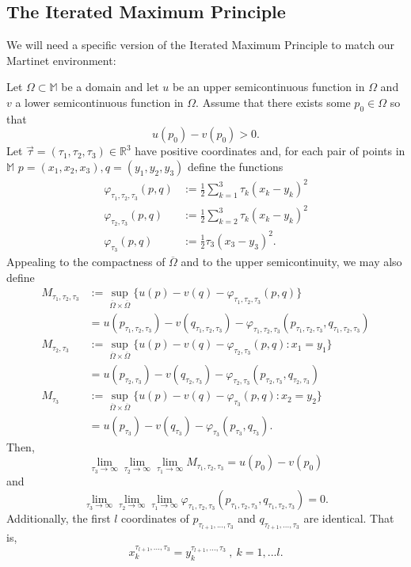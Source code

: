 \documentclass[reqno]{amsart}
\begin{document}
\subsection{The Iterated Maximum Principle}
We will need a specific version of the Iterated Maximum Principle to match our Martinet environment: 
\begin{lemma}\label{IMP}\cite{B:GS}
Let $\Omega\subset\mathbb{M}$ be a domain and let  $u$ be an upper semicontinuous function in $\Omega$ and $v$ a lower semicontinuous function in $\Omega$.  Assume that there exists some $p_0\in\Omega$ so that
\[u(p_0)-v(p_0)>0.\]
Let $\vec{\tau}=(\tau_1,\tau_2,\tau_3)\in\mathbb{R}^3$ have positive coordinates and, for each pair of points in $\mathbb{M}$ $p=(x_1,x_2,x_3),q=(y_1,y_2,y_3)$ define the functions 
\begin{align*}
\varphi_{\tau_1,\tau_2,\tau_3}(p,q)&:=\frac{1}{2}\sum_{k=1}^3\tau_k(x_k-y_k)^2\\
\varphi_{\tau_2,\tau_3}(p,q)&:=\frac{1}{2}\sum_{k=2}^3\tau_k(x_k-y_k)^2\\
\varphi_{\tau_3}(p,q)&:=\frac{1}{2}\tau_3(x_3-y_3)^2.
\end{align*}
Appealing to the compactness of $\overline{\Omega}$ and to the upper semicontinuity, we may also define 
\begin{align*} 
M_{\tau_1,\tau_2,\tau_3}&:=\sup_{\overline{\Omega}\times\overline{\Omega}}\{u(p)-v(q)-\varphi_{\tau_1,\tau_2,\tau_3}(p,q)\}\\
&=u(p_{\tau_1,\tau_2,\tau_3})-v(q_{\tau_1,\tau_2,\tau_3})-\varphi_{\tau_1,\tau_2,\tau_3}(p_{\tau_1,\tau_2,\tau_3},q_{\tau_1,\tau_2,\tau_3})\\
M_{\tau_2,\tau_3}&:=\sup_{\overline{\Omega}\times\overline{\Omega}}\{u(p)-v(q)-\varphi_{\tau_2,\tau_3}(p,q):x_1=y_1\}\\
&=u(p_{\tau_2,\tau_3})-v(q_{\tau_2,\tau_3})-\varphi_{\tau_2,\tau_3}(p_{\tau_2,\tau_3},q_{\tau_2,\tau_3})\\
M_{\tau_3}&:=\sup_{\overline{\Omega}\times\overline{\Omega}}\{u(p)-v(q)-\varphi_{\tau_3}(p,q):x_2=y_2\}\\
&=u(p_{\tau_3})-v(q_{\tau_3})-\varphi_{\tau_3}(p_{\tau_3},q_{\tau_3}).
\end{align*}
Then,
\[\lim_{\tau_3\to\infty}\lim_{\tau_2\to\infty}\lim_{\tau_1\to\infty}M_{\tau_1,\tau_2,\tau_3}=u(p_0)-v(p_0)\]
and
\[\lim_{\tau_3\to\infty}\lim_{\tau_2\to\infty}\lim_{\tau_1\to\infty}\varphi_{\tau_1,\tau_2,\tau_3}(p_{\tau_1,\tau_2,\tau_3},q_{\tau_1,\tau_2,\tau_3})=0.\]
Additionally, the first $l$ coordinates of $p_{\tau_{l+1},...,\tau_3}$ and $q_{\tau_{l+1},...,\tau_3}$ are identical. That is, 
\[x_k^{\tau_{l+1},...,\tau_3}=y_k^{\tau_{l+1},...,\tau_3}\:,\:k=1,...l.\]
\end{lemma}
\end{document}
